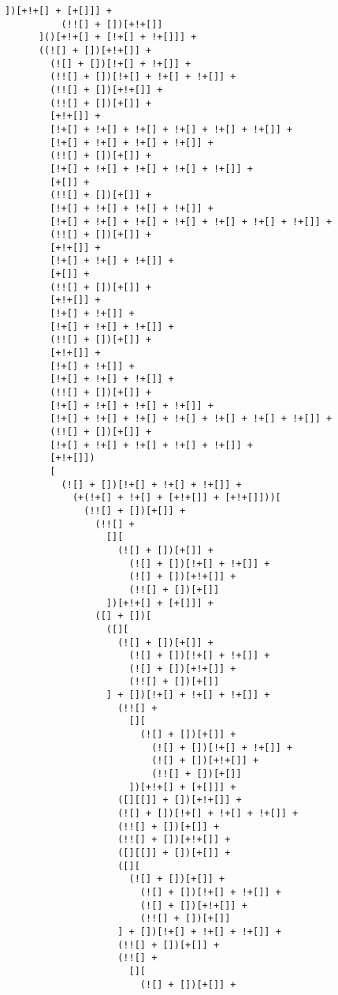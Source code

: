 \begin{lstlisting}[style=basicStyle, caption=alert('XSS') in JSFuck, label={lst:alertxssjsfuck}]
            ])[+!+[] + [+[]]] +
          (!![] + [])[+!+[]]
      ]()[+!+[] + [!+[] + !+[]]] +
      ((![] + [])[+!+[]] +
        (![] + [])[!+[] + !+[]] +
        (!![] + [])[!+[] + !+[] + !+[]] +
        (!![] + [])[+!+[]] +
        (!![] + [])[+[]] +
        [+!+[]] +
        [!+[] + !+[] + !+[] + !+[] + !+[] + !+[]] +
        [!+[] + !+[] + !+[] + !+[]] +
        (!![] + [])[+[]] +
        [!+[] + !+[] + !+[] + !+[] + !+[]] +
        [+[]] +
        (!![] + [])[+[]] +
        [!+[] + !+[] + !+[] + !+[]] +
        [!+[] + !+[] + !+[] + !+[] + !+[] + !+[] + !+[]] +
        (!![] + [])[+[]] +
        [+!+[]] +
        [!+[] + !+[] + !+[]] +
        [+[]] +
        (!![] + [])[+[]] +
        [+!+[]] +
        [!+[] + !+[]] +
        [!+[] + !+[] + !+[]] +
        (!![] + [])[+[]] +
        [+!+[]] +
        [!+[] + !+[]] +
        [!+[] + !+[] + !+[]] +
        (!![] + [])[+[]] +
        [!+[] + !+[] + !+[] + !+[]] +
        [!+[] + !+[] + !+[] + !+[] + !+[] + !+[] + !+[]] +
        (!![] + [])[+[]] +
        [!+[] + !+[] + !+[] + !+[] + !+[]] +
        [+!+[]])
        [
          (![] + [])[!+[] + !+[] + !+[]] +
            (+(!+[] + !+[] + [+!+[]] + [+!+[]]))[
              (!![] + [])[+[]] +
                (!![] +
                  [][
                    (![] + [])[+[]] +
                      (![] + [])[!+[] + !+[]] +
                      (![] + [])[+!+[]] +
                      (!![] + [])[+[]]
                  ])[+!+[] + [+[]]] +
                ([] + [])[
                  ([][
                    (![] + [])[+[]] +
                      (![] + [])[!+[] + !+[]] +
                      (![] + [])[+!+[]] +
                      (!![] + [])[+[]]
                  ] + [])[!+[] + !+[] + !+[]] +
                    (!![] +
                      [][
                        (![] + [])[+[]] +
                          (![] + [])[!+[] + !+[]] +
                          (![] + [])[+!+[]] +
                          (!![] + [])[+[]]
                      ])[+!+[] + [+[]]] +
                    ([][[]] + [])[+!+[]] +
                    (![] + [])[!+[] + !+[] + !+[]] +
                    (!![] + [])[+[]] +
                    (!![] + [])[+!+[]] +
                    ([][[]] + [])[+[]] +
                    ([][
                      (![] + [])[+[]] +
                        (![] + [])[!+[] + !+[]] +
                        (![] + [])[+!+[]] +
                        (!![] + [])[+[]]
                    ] + [])[!+[] + !+[] + !+[]] +
                    (!![] + [])[+[]] +
                    (!![] +
                      [][
                        (![] + [])[+[]] +

\end{lstlisting}
